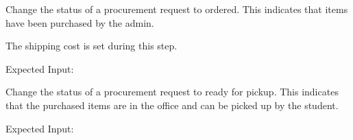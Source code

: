\documentclass[letterpaper,10pt,english]{sphinxmanual}
\begin{document}
\begin{fulllineitems}
\begin{fulllineitems}
\end{fulllineitems}


\begin{fulllineitems}
\label{\detokenize{apidoc/utdesign_procurement:utdesign_procurement.apigateway.ApiGateway.procurementOrder}}
Change the status of a procurement request to ordered. This
indicates that items have been purchased by the admin.

The shipping cost is set during this step.

Expected Input:

\begin{sphinxVerbatim}[commandchars=\\\{\}]
     
     
\end{sphinxVerbatim}

\end{fulllineitems}


\begin{fulllineitems}
\label{\detokenize{apidoc/utdesign_procurement:utdesign_procurement.apigateway.ApiGateway.procurementReady}}
Change the status of a procurement request to ready for pickup. This
indicates that the purchased items are in the office and can be
picked up by the student.

Expected Input:

\begin{sphinxVerbatim}[commandchars=\\\{\}]
     
\end{sphinxVerbatim}

\end{fulllineitems}


\end{fulllineitems}
\end{document}
